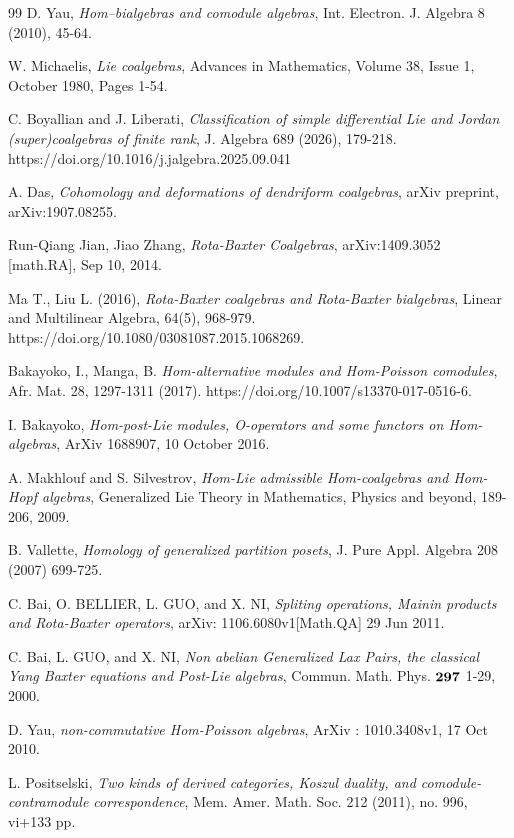\documentclass{article}
\theoremstyle{definition}
\theoremstyle{remark}
\numberwithin{equation}{section}
\begin{document}
\begin{thebibliography}{99} 
D. Yau, {\it Hom–bialgebras and comodule algebras}, Int. Electron. J. Algebra 8 (2010), 45-64.

W. Michaelis, {\it Lie coalgebras}, Advances in Mathematics, Volume 38, Issue 1, October 1980, Pages 1-54.

C. Boyallian and J. Liberati, {\it Classification of simple differential Lie and Jordan (super)coalgebras of finite rank}, J. Algebra 689 (2026), 179-218. https://doi.org/10.1016/j.jalgebra.2025.09.041

 A. Das, {\it Cohomology and deformations of dendriform coalgebras}, arXiv preprint, arXiv:1907.08255.

 Run-Qiang Jian, Jiao Zhang, {\it Rota-Baxter Coalgebras}, arXiv:1409.3052 [math.RA], Sep 10, 2014.

  Ma T.,  Liu L. (2016), {\it Rota-Baxter coalgebras and Rota-Baxter bialgebras}, Linear and Multilinear Algebra, 64(5), 968-979. https://doi.org/10.1080/03081087.2015.1068269.

 Bakayoko, I., Manga, B. {\it Hom-alternative modules and Hom-Poisson comodules}, Afr. Mat. 28, 1297-1311 (2017). https://doi.org/10.1007/s13370-017-0516-6.

 I. Bakayoko, {\it Hom-post-Lie modules, O-operators and some functors on Hom-algebras}, ArXiv 1688907, 10 October 2016.

  A. Makhlouf  and S. Silvestrov, {\it Hom-Lie admissible Hom-coalgebras and Hom-Hopf algebras}, Generalized Lie Theory in Mathematics, Physics and beyond, 189-206, 2009.

 B. Vallette, {\it Homology of generalized partition posets}, J. Pure Appl. Algebra 208 (2007) 699-725.

  C. Bai, O. BELLIER, L. GUO, and  X. NI,
 {\it Spliting operations, Mainin products and Rota-Baxter operators}, arXiv: 1106.6080v1[Math.QA] 29 Jun 2011.

 C. Bai, L. GUO, and  X. NI,
 {\it Non abelian Generalized Lax Pairs, the classical Yang Baxter equations and Post-Lie algebras}, Commun. Math. Phys. $\bf 297$ 1-29, 2000.

  D. Yau, {\it non-commutative Hom-Poisson algebras}, ArXiv : 1010.3408v1, 17 Oct 2010.

 L. Positselski, {\it Two kinds of derived categories, Koszul duality, and comodule-contramodule correspondence}, Mem. Amer. Math. Soc. 212 (2011), no. 996, vi+133 pp.


\end{thebibliography}
\end{document}
